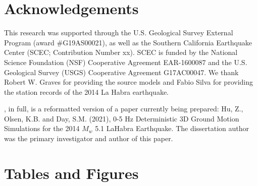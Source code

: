 \section*{Acknowledgements}

This research was supported through the U.S. Geological Survey External Program (award \#G19AS00021), as well as the Southern California Earthquake Center (SCEC; Contribution Number xx). SCEC is funded by the National Science Foundation (NSF) Cooperative Agreement EAR-1600087 and the U.S. Geological Survey (USGS) Cooperative Agreement G17AC00047. We thank Robert W. Graves for providing the source models and Fabio Silva for providing the station records of the 2014 La Habra earthquake.

, in full, is a reformatted version of a paper currently being prepared: Hu, Z., Olsen, K.B. and Day, S.M. (2021), 0-5 Hz Deterministic 3D Ground Motion Simulations for the 2014 $M_w$ 5.1 LaHabra Earthquake. The dissertation author was the primary investigator and author of this paper.

\newpage
\section*{Tables and Figures}
%


